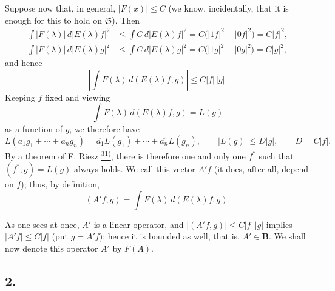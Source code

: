 \documentclass[12pt,b5paper,twoside]{article}
\newcommand{\noteref}[1]{%
  \hyperlink{note:#1}{\textsuperscript{#1)}}}
\begin{document}
Suppose now that, in general, \(|F(x)|\leq C\) (we know, incidentally, that
it is enough for this to hold on \(\mathfrak S\)).  Then
\begin{align*}
 \int |F(\lambda)|\,d|E(\lambda)f|^2
 &\leq \int C\,d|E(\lambda)f|^2
  =C\bigl(|1f|^2-|0f|^2\bigr)=C|f|^2,\\
 \int |F(\lambda)|\,d|E(\lambda)g|^2
 &\leq \int C\,d|E(\lambda)g|^2
  =C\bigl(|1g|^2-|0g|^2\bigr)=C|g|^2,
\end{align*}
and hence
\[
 \left|\int F(\lambda)\,d(E(\lambda)f,g)\right|
 \leq C|f|\,|g|.
\]
Keeping \(f\) fixed and viewing
\[
 \int F(\lambda)\,d(E(\lambda)f,g)=L(g)
\]
as a function of \(g\), we therefore have
\[
 L(a_1g_1+\cdots+a_ng_n)
 =\overline{a_1}L(g_1)+\cdots+\overline{a_n}L(g_n),
 \qquad |L(g)|\leq D|g|,
 \qquad D=C|f|.
\]
By a theorem of F. Riesz\noteref{31}, there is therefore one and only one
\(f^*\) such that \((f^*,g)=L(g)\) always holds.  We call this vector
\(A'f\) (it does, after all, depend on \(f\)); thus, by definition,
\[
 (A'f,g)=\int F(\lambda)\,d(E(\lambda)f,g).
\]

As one sees at once, \(A'\) is a linear operator, and
\(|(A'f,g)|\leq C|f|\,|g|\) implies \(|A'f|\leq C|f|\) (put
\(g=A'f\)); hence it is bounded as well, that is, \(A'\in \mathbf B\).
We shall now denote this operator \(A'\) by \(F(A)\).

\subsection*{2.}\label{sec:II.2}
\end{document}
